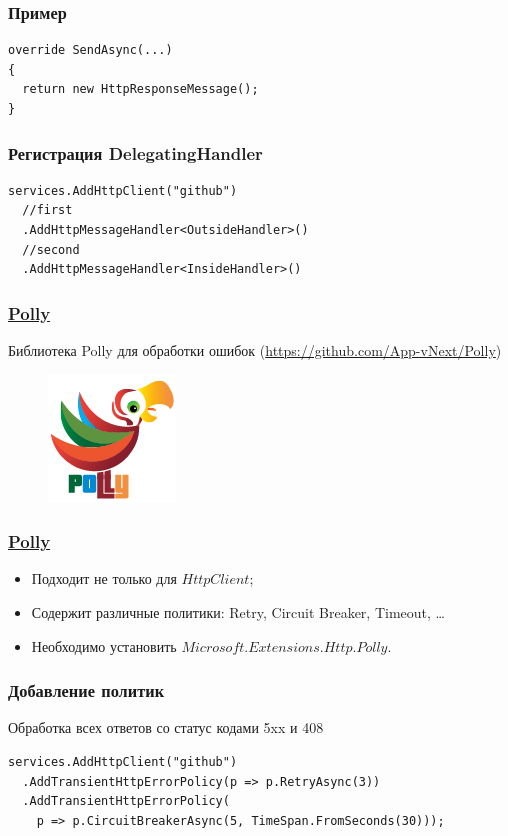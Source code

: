 \documentclass[17pt,aspectratio=169]{beamer}
\begin{document}
\begin{frame}[fragile]
\frametitle{Пример}
\begin{lstlisting}
override SendAsync(...)
{
  return new HttpResponseMessage();
}     
\end{lstlisting}
\end{frame}

\begin{frame}[fragile]
\frametitle{Регистрация DelegatingHandler}
\begin{lstlisting}
services.AddHttpClient("github")
  //first
  .AddHttpMessageHandler<OutsideHandler>()
  //second
  .AddHttpMessageHandler<InsideHandler>()
\end{lstlisting}
\end{frame}

\begin{frame}
\frametitle{\href{https://github.com/App-vNext/Polly}{Polly}}
Библиотека Polly для обработки ошибок (\href{https://github.com/App-vNext/Polly}{https://github.com/App-vNext/Polly})
\begin{figure}
\includegraphics[scale=0.4]{polly}
\end{figure}
\end{frame}

\begin{frame}
\frametitle{\href{https://github.com/App-vNext/Polly}{Polly}}
\begin{itemize}
	\item <1-> Подходит не только для $HttpClient$;
	\item <2-> Содержит различные политики: Retry, Circuit Breaker, Timeout, \ldots
	\item <3-> Необходимо установить \href{https://www.nuget.org/packages/Microsoft.Extensions.Http.Polly/}{$Microsoft.Extensions.Http.Polly$}.
\end{itemize}
\end{frame}

\begin{frame}[fragile]
\frametitle{Добавление политик}
Обработка всех ответов со статус кодами 5xx и 408
\newline
\begin{lstlisting}
services.AddHttpClient("github")
  .AddTransientHttpErrorPolicy(p => p.RetryAsync(3))
  .AddTransientHttpErrorPolicy(
    p => p.CircuitBreakerAsync(5, TimeSpan.FromSeconds(30)));
\end{lstlisting}
\end{frame}
\end{document}
